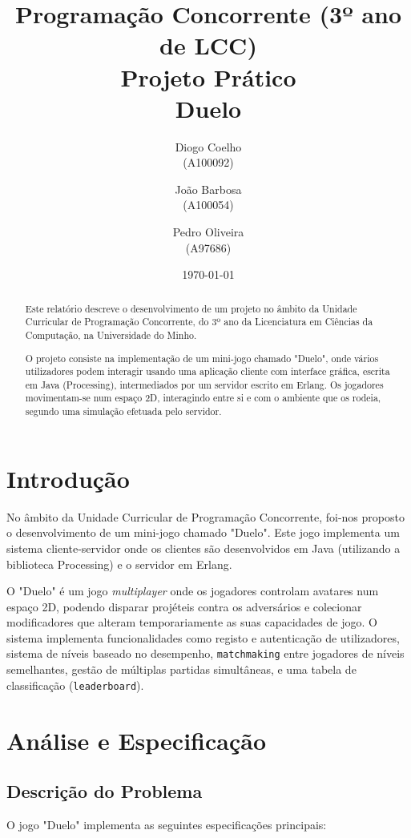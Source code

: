 \documentclass[12pt,a4paper]{report}
\title{Programação Concorrente (3º ano de LCC)\\
       Projeto Prático\\ 
       \textbf{Duelo}
       }
\author{Diogo Coelho \\ (A100092) \and 
         \and João Barbosa\\ (A100054) \and Pedro Oliveira\\ (A97686)
       }
\date{\today}
\begin{document}
\maketitle

\begin{abstract}
Este relatório descreve o desenvolvimento de um projeto no âmbito da Unidade Curricular de Programação Concorrente, do 3º ano da Licenciatura em Ciências da Computação, na Universidade do Minho.

O projeto consiste na implementação de um mini-jogo chamado "Duelo", onde vários utilizadores podem interagir usando uma aplicação cliente com interface gráfica, escrita em Java (Processing), intermediados por um servidor escrito em Erlang. Os jogadores movimentam-se num espaço 2D, interagindo entre si e com o ambiente que os rodeia, segundo uma simulação efetuada pelo servidor.
\end{abstract}

\tableofcontents

\chapter{Introdução}
No âmbito da Unidade Curricular de Programação Concorrente, foi-nos proposto o desenvolvimento de um mini-jogo chamado "Duelo". Este jogo implementa um sistema cliente-servidor onde os clientes são desenvolvidos em Java (utilizando a biblioteca Processing) e o servidor em Erlang.

O "Duelo" é um jogo \textit{multiplayer} onde os jogadores controlam avatares num espaço 2D, podendo disparar projéteis contra os adversários e colecionar modificadores que alteram temporariamente as suas capacidades de jogo. O sistema implementa funcionalidades como registo e autenticação de utilizadores, sistema de níveis baseado no desempenho, \texttt{matchmaking} entre jogadores de níveis semelhantes, gestão de múltiplas partidas simultâneas, e uma tabela de classificação (\texttt{leaderboard}).

\chapter{Análise e Especificação}

\section{Descrição do Problema}

O jogo "Duelo" implementa as seguintes especificações principais:
\end{document}
